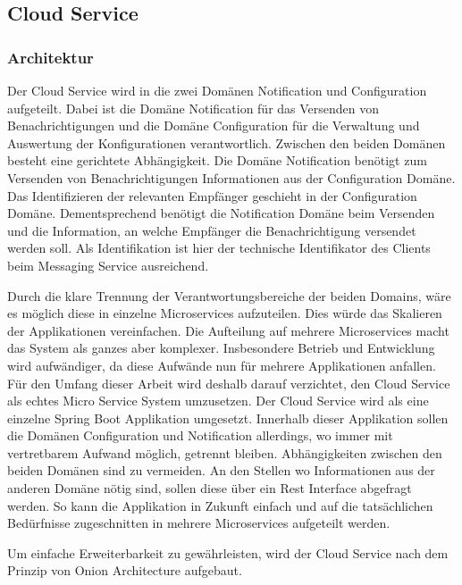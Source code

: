 \subsection{Cloud Service}\label{subsec:cloud-service}

\subsubsection{Architektur}

Der Cloud Service wird in die zwei Domänen Notification und Configuration aufgeteilt.
Dabei ist die Domäne Notification für das Versenden von Benachrichtigungen
und die Domäne Configuration für die Verwaltung und Auswertung der Konfigurationen verantwortlich.
Zwischen den beiden Domänen besteht eine gerichtete Abhängigkeit.
Die Domäne Notification benötigt zum Versenden von Benachrichtigungen Informationen aus der Configuration Domäne.
Das Identifizieren der relevanten Empfänger geschieht in der Configuration Domäne.
Dementsprechend benötigt die Notification Domäne beim Versenden und die Information, an welche Empfänger die Benachrichtigung versendet werden soll.
Als Identifikation ist hier der technische Identifikator des Clients beim Messaging Service ausreichend.

Durch die klare Trennung der Verantwortungsbereiche der beiden Domains, wäre es möglich diese in einzelne Microservices aufzuteilen.
Dies würde das Skalieren der Applikationen vereinfachen.
Die Aufteilung auf mehrere Microservices macht das System als ganzes aber komplexer.
Insbesondere Betrieb und Entwicklung wird aufwändiger, da diese Aufwände nun für mehrere Applikationen anfallen.
Für den Umfang dieser Arbeit wird deshalb darauf verzichtet, den Cloud Service als echtes Micro Service System umzusetzen.
Der Cloud Service wird als eine einzelne Spring Boot Applikation umgesetzt.
Innerhalb dieser Applikation sollen die Domänen Configuration und Notification allerdings, wo immer mit vertretbarem Aufwand möglich, getrennt bleiben.
Abhängigkeiten zwischen den beiden Domänen sind zu vermeiden.
An den Stellen wo Informationen aus der anderen Domäne nötig sind, sollen diese über ein Rest Interface abgefragt werden.
So kann die Applikation in Zukunft einfach und auf die tatsächlichen Bedürfnisse zugeschnitten in mehrere Microservices aufgeteilt werden.

Um einfache Erweiterbarkeit zu gewährleisten, wird der Cloud Service nach dem Prinzip von Onion Architecture aufgebaut.

